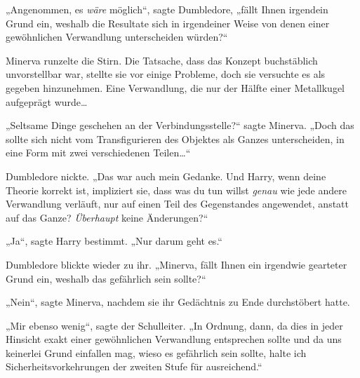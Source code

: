 „Angenommen, es \emph{wäre} möglich“, sagte Dumbledore, „fällt Ihnen irgendein Grund ein, weshalb die Resultate sich in irgendeiner Weise von denen einer gewöhnlichen Verwandlung unterscheiden würden?“

Minerva runzelte die Stirn. Die Tatsache, dass das Konzept buchstäblich unvorstellbar war, stellte sie vor einige Probleme, doch sie versuchte es als gegeben hinzunehmen. Eine Verwandlung, die nur der Hälfte einer Metallkugel aufgeprägt wurde…

„Seltsame Dinge geschehen an der Verbindungsstelle?“ sagte Minerva. „Doch das sollte sich nicht vom Transfigurieren des Objektes als Ganzes unterscheiden, in eine Form mit zwei verschiedenen Teilen…“

Dumbledore nickte. „Das war auch mein Gedanke. Und Harry, wenn deine Theorie korrekt ist, impliziert sie, dass was du tun willst \emph{genau} wie jede andere Verwandlung verläuft, nur auf einen Teil des Gegenstandes angewendet, anstatt auf das Ganze? \emph{Überhaupt} keine Änderungen?“

„Ja“, sagte Harry bestimmt. „Nur darum geht es.“

Dumbledore blickte wieder zu ihr. „Minerva, fällt Ihnen ein irgendwie gearteter Grund ein, weshalb das gefährlich sein sollte?“

„Nein“, sagte Minerva, nachdem sie ihr Gedächtnis zu Ende durchstöbert hatte.

„Mir ebenso wenig“, sagte der Schulleiter. „In Ordnung, dann, da dies in jeder Hinsicht exakt einer gewöhnlichen Verwandlung entsprechen sollte und da uns keinerlei Grund einfallen mag, wieso es gefährlich sein sollte, halte ich Sicherheitsvorkehrungen der zweiten Stufe für ausreichend.“

